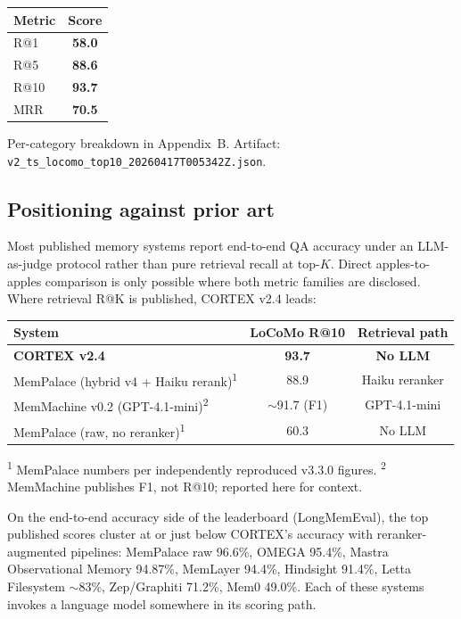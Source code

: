 \documentclass{article}
\begin{document}
\begin{center}
\begin{tabular}{lc}
\toprule
Metric & Score \\
\midrule
R@1  & \textbf{58.0} \\
R@5  & \textbf{88.6} \\
R@10 & \textbf{93.7} \\
MRR  & \textbf{70.5} \\
\bottomrule
\end{tabular}
\end{center}

Per-category breakdown in Appendix~B. Artifact:
\texttt{v2\_ts\_locomo\_top10\_20260417T005342Z.json}.

\subsection{Positioning against prior art}

Most published memory systems report end-to-end QA accuracy under an
LLM-as-judge protocol rather than pure retrieval recall at top-$K$.
Direct apples-to-apples comparison is only possible where both metric
families are disclosed. Where retrieval R@K is published, CORTEX v2.4
leads:

\begin{center}
\begin{tabular}{lcc}
\toprule
System & LoCoMo R@10 & Retrieval path \\
\midrule
\textbf{CORTEX v2.4}                                 & \textbf{93.7}            & \textbf{No LLM}    \\
MemPalace (hybrid v4 + Haiku rerank)\textsuperscript{1} & 88.9                  & Haiku reranker     \\
MemMachine v0.2 (GPT-4.1-mini)\textsuperscript{2}    & $\sim$91.7 (F1)          & GPT-4.1-mini       \\
MemPalace (raw, no reranker)\textsuperscript{1}      & 60.3                     & No LLM             \\
\bottomrule
\end{tabular}
\end{center}

\textsuperscript{1} MemPalace numbers per independently reproduced
v3.3.0 figures.
\textsuperscript{2} MemMachine publishes F1, not R@10; reported here
for context.

On the end-to-end accuracy side of the leaderboard (LongMemEval), the
top published scores cluster at or just below CORTEX's accuracy with
reranker-augmented pipelines: MemPalace raw 96.6\%, OMEGA 95.4\%,
Mastra Observational Memory 94.87\%, MemLayer 94.4\%, Hindsight 91.4\%,
Letta Filesystem $\sim$83\%, Zep/Graphiti 71.2\%, Mem0 49.0\%. Each of
these systems invokes a language model somewhere in its scoring path.
\end{document}
